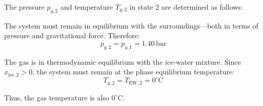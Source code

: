 The pressure \( p_{g,2} \) and temperature \( T_{g,2} \) in state 2 are determined as follows:  

The system must remain in equilibrium with the surroundings—both in terms of pressure and gravitational force. Therefore:  
\[
p_{g,2} = p_{g,1} = 1.40 \, \text{bar}
\]  

The gas is in thermodynamic equilibrium with the ice-water mixture. Since \( x_{\text{ice},2} > 0 \), the system must remain at the phase equilibrium temperature:  
\[
T_{g,2} = T_{\text{EW},2} = 0^\circ \text{C}
\]  

Thus, the gas temperature is also \( 0^\circ \text{C} \).